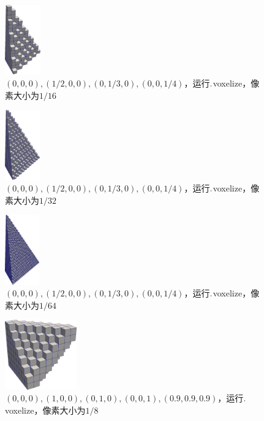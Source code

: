 \begin{figure}[!htbp]
  \centering
  \includegraphics[height=3cm]{fig/1/1.2/6.png}
    \caption{$(0,0,0),(1/2,0,0),(0,1/3,0),(0,0,1/4)$，运行$.\\$voxelize，像素大小为$1/16$}
  \label{fig:1-7}
\end{figure}

\begin{figure}[!htbp]
  \centering
  \includegraphics[height=3cm]{fig/1/1.2/7.png}
    \caption{$(0,0,0),(1/2,0,0),(0,1/3,0),(0,0,1/4)$，运行$.\\$voxelize，像素大小为$1/32$}
  \label{fig:1-7}
\end{figure}

\begin{figure}[!htbp]
  \centering
  \includegraphics[height=3cm]{fig/1/1.2/8.png}
    \caption{$(0,0,0),(1/2,0,0),(0,1/3,0),(0,0,1/4)$，运行$.\\$voxelize，像素大小为$1/64$}
  \label{fig:1-7}
\end{figure}

\begin{figure}[!htbp]
  \centering
  \includegraphics[height=3cm]{fig/1/1.2/9.png}
  \caption{$(0,0,0),(1,0,0),(0,1,0),(0,0,1),(0.9,0.9,0.9)$，运行$.\\$voxelize，像素大小为$1/8$}
  \label{fig:1-7}
\end{figure}

